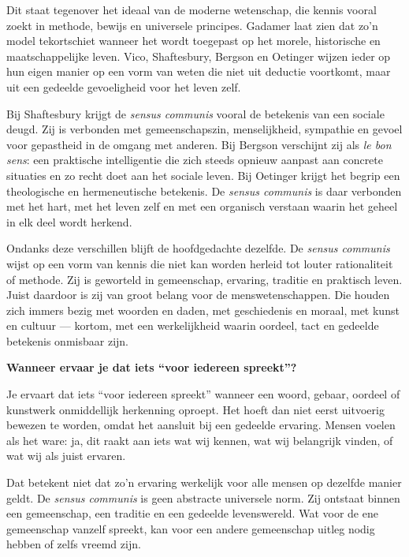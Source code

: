 \documentclass[11pt,twoside,openright]{memoir}
\begin{document}
Dit staat tegenover het ideaal van de moderne wetenschap, die kennis vooral zoekt in methode, bewijs en universele principes. Gadamer laat zien dat zo'n model tekortschiet wanneer het wordt toegepast op het morele, historische en maatschappelijke leven. Vico, Shaftesbury, Bergson en Oetinger wijzen ieder op hun eigen manier op een vorm van weten die niet uit deductie voortkomt, maar uit een gedeelde gevoeligheid voor het leven zelf.

Bij Shaftesbury krijgt de \textit{sensus communis} vooral de betekenis van een sociale deugd. Zij is verbonden met gemeenschapszin, menselijkheid, sympathie en gevoel voor gepastheid in de omgang met anderen. Bij Bergson verschijnt zij als \textit{le bon sens}: een praktische intelligentie die zich steeds opnieuw aanpast aan concrete situaties en zo recht doet aan het sociale leven. Bij Oetinger krijgt het begrip een theologische en hermeneutische betekenis. De \textit{sensus communis} is daar verbonden met het hart, met het leven zelf en met een organisch verstaan waarin het geheel in elk deel wordt herkend.

Ondanks deze verschillen blijft de hoofdgedachte dezelfde. De \textit{sensus communis} wijst op een vorm van kennis die niet kan worden herleid tot louter rationaliteit of methode. Zij is geworteld in gemeenschap, ervaring, traditie en praktisch leven. Juist daardoor is zij van groot belang voor de menswetenschappen. Die houden zich immers bezig met woorden en daden, met geschiedenis en moraal, met kunst en cultuur — kortom, met een werkelijkheid waarin oordeel, tact en gedeelde betekenis onmisbaar zijn.

\bigskip
\noindent
\textbf{Wanneer ervaar je dat iets ``voor iedereen spreekt''?}
\medskip

Je ervaart dat iets ``voor iedereen spreekt'' wanneer een woord, gebaar, oordeel of kunstwerk onmiddellijk herkenning oproept. Het hoeft dan niet eerst uitvoerig bewezen te worden, omdat het aansluit bij een gedeelde ervaring. Mensen voelen als het ware: ja, dit raakt aan iets wat wij kennen, wat wij belangrijk vinden, of wat wij als juist ervaren.

Dat betekent niet dat zo'n ervaring werkelijk voor alle mensen op dezelfde manier geldt. De \textit{sensus communis} is geen abstracte universele norm. Zij ontstaat binnen een gemeenschap, een traditie en een gedeelde levenswereld. Wat voor de ene gemeenschap vanzelf spreekt, kan voor een andere gemeenschap uitleg nodig hebben of zelfs vreemd zijn.
\end{document}
